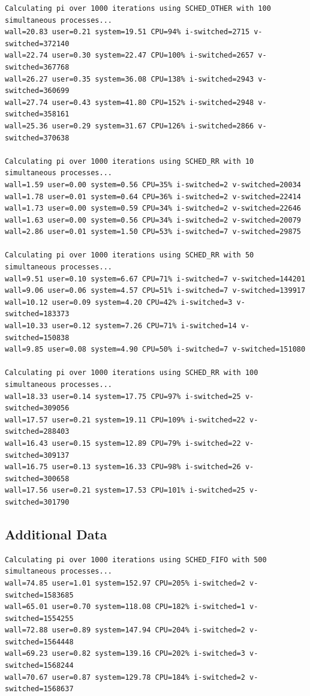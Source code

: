 \documentclass[12pt]{article}
\begin{document}
\begin{small}
\begin{verbatim}
Calculating pi over 1000 iterations using SCHED_OTHER with 100 simultaneous processes...
wall=20.83 user=0.21 system=19.51 CPU=94% i-switched=2715 v-switched=372140
wall=22.74 user=0.30 system=22.47 CPU=100% i-switched=2657 v-switched=367768
wall=26.27 user=0.35 system=36.08 CPU=138% i-switched=2943 v-switched=360699
wall=27.74 user=0.43 system=41.80 CPU=152% i-switched=2948 v-switched=358161
wall=25.36 user=0.29 system=31.67 CPU=126% i-switched=2866 v-switched=370638

Calculating pi over 1000 iterations using SCHED_RR with 10 simultaneous processes...
wall=1.59 user=0.00 system=0.56 CPU=35% i-switched=2 v-switched=20034
wall=1.78 user=0.01 system=0.64 CPU=36% i-switched=2 v-switched=22414
wall=1.73 user=0.00 system=0.59 CPU=34% i-switched=2 v-switched=22646
wall=1.63 user=0.00 system=0.56 CPU=34% i-switched=2 v-switched=20079
wall=2.86 user=0.01 system=1.50 CPU=53% i-switched=7 v-switched=29875

Calculating pi over 1000 iterations using SCHED_RR with 50 simultaneous processes...
wall=9.51 user=0.10 system=6.67 CPU=71% i-switched=7 v-switched=144201
wall=9.06 user=0.06 system=4.57 CPU=51% i-switched=7 v-switched=139917
wall=10.12 user=0.09 system=4.20 CPU=42% i-switched=3 v-switched=183373
wall=10.33 user=0.12 system=7.26 CPU=71% i-switched=14 v-switched=150838
wall=9.85 user=0.08 system=4.90 CPU=50% i-switched=7 v-switched=151080

Calculating pi over 1000 iterations using SCHED_RR with 100 simultaneous processes...
wall=18.33 user=0.14 system=17.75 CPU=97% i-switched=25 v-switched=309056
wall=17.57 user=0.21 system=19.11 CPU=109% i-switched=22 v-switched=288403
wall=16.43 user=0.15 system=12.89 CPU=79% i-switched=22 v-switched=309137
wall=16.75 user=0.13 system=16.33 CPU=98% i-switched=26 v-switched=300658
wall=17.56 user=0.21 system=17.53 CPU=101% i-switched=25 v-switched=301790
\end{verbatim}

\subsection{Additional Data}
\begin{verbatim}
Calculating pi over 1000 iterations using SCHED_FIFO with 500 simultaneous processes...
wall=74.85 user=1.01 system=152.97 CPU=205% i-switched=2 v-switched=1583685
wall=65.01 user=0.70 system=118.08 CPU=182% i-switched=1 v-switched=1554255
wall=72.88 user=0.89 system=147.94 CPU=204% i-switched=2 v-switched=1564448
wall=69.23 user=0.82 system=139.16 CPU=202% i-switched=3 v-switched=1568244
wall=70.67 user=0.87 system=129.78 CPU=184% i-switched=2 v-switched=1568637


\end{verbatim}
\end{small}
\end{document}
